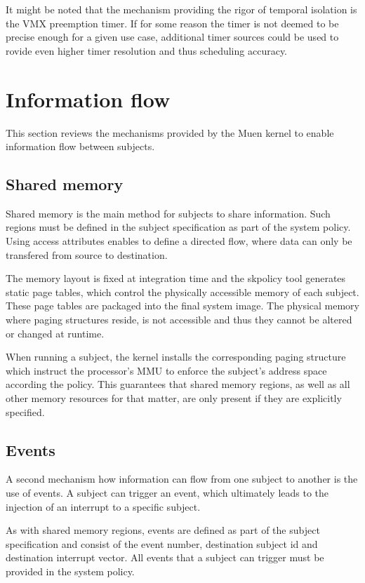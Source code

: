 It might be noted that the mechanism providing the rigor of temporal isolation
is the VMX preemption timer. If for some reason the timer is not deemed to be
precise enough for a given use case, additional timer sources could be used to
rovide even higher timer resolution and thus scheduling accuracy.

\section{Information flow}
This section reviews the mechanisms provided by the Muen kernel to enable
information flow between subjects.

\subsection{Shared memory}
Shared memory is the main method for subjects to share information. Such regions
must be defined in the subject specification as part of the system policy. Using
access attributes enables to define a directed flow, where data can only be
transfered from source to destination.

The memory layout is fixed at integration time and the skpolicy tool generates
static page tables, which control the physically accessible memory of each
subject. These page tables are packaged into the final system image. The
physical memory where paging structures reside, is not accessible and thus they
cannot be altered or changed at runtime.

When running a subject, the kernel installs the corresponding paging structure
which instruct the processor's MMU to enforce the subject's address space
according the policy. This guarantees that shared memory regions, as well as all
other memory resources for that matter, are only present if they are explicitly
specified.

\subsection{Events}
A second mechanism how information can flow from one subject to another is the
use of events. A subject can trigger an event, which ultimately leads to the
injection of an interrupt to a specific subject.

As with shared memory regions, events are defined as part of the subject
specification and consist of the event number, destination subject id and
destination interrupt vector. All events that a subject can trigger must be
provided in the system policy.

